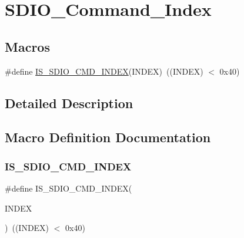 \hypertarget{group___s_d_i_o___command___index}{}\section{S\+D\+I\+O\+\_\+\+Command\+\_\+\+Index}
\label{group___s_d_i_o___command___index}
\subsection*{Macros}
\begin{DoxyCompactItemize}
\item 
\#define \mbox{\hyperlink{group___s_d_i_o___command___index_gae988f9f37c4ebb5f5f9866acb30f2880}{I\+S\+\_\+\+S\+D\+I\+O\+\_\+\+C\+M\+D\+\_\+\+I\+N\+D\+EX}}(I\+N\+D\+EX)~((I\+N\+D\+EX) $<$ 0x40)
\end{DoxyCompactItemize}


\subsection{Detailed Description}


\subsection{Macro Definition Documentation}
\mbox{\label{group___s_d_i_o___command___index_gae988f9f37c4ebb5f5f9866acb30f2880}} 
\subsubsection{\texorpdfstring{IS\_SDIO\_CMD\_INDEX}{IS\_SDIO\_CMD\_INDEX}}
{\footnotesize\ttfamily \#define I\+S\+\_\+\+S\+D\+I\+O\+\_\+\+C\+M\+D\+\_\+\+I\+N\+D\+EX(\begin{DoxyParamCaption}\item[{}]{I\+N\+D\+EX }\end{DoxyParamCaption})~((I\+N\+D\+EX) $<$ 0x40)}

